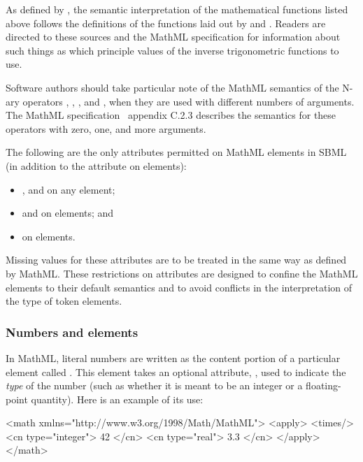 As defined by \mathmltwo, the semantic interpretation of the
mathematical functions listed above follows the definitions of the
functions laid out by \cite{abramowitz:1997} and
\cite{zwillinger:1988}.  Readers are directed to these sources and
the MathML specification for information about such things as
which principle values of the inverse trigonometric functions to
use.

Software authors should take particular note of the MathML
semantics of the N-ary operators , ,
,  and , when they are used with
different numbers of arguments.  The MathML
specification~\citep{w3c:2000b} appendix C.2.3 describes the
semantics for these operators with zero, one, and more arguments.

The following are the only attributes permitted on MathML elements
in SBML (in addition to the  attribute on
 elements):
\begin{itemize}\setlength{\parskip}{-0.2ex}

\item {},  and  on any element;

\item {} and  on
   elements; and

\item {} on  elements.

\end{itemize}\vspace*{-0.75ex}
Missing values for these attributes are to be treated in the same
way as defined by MathML.  These restrictions on attributes are
designed to confine the MathML elements to their default semantics
and to avoid conflicts in the interpretation of the type of token
elements.


\subsubsection{Numbers and  elements}
\label{sec:cn-token}
\label{sec:mathml-value-space}

In MathML, literal numbers are written as the content portion of a
particular element called .  This element takes an
optional attribute, , used to indicate the \emph{type}
of the number (such as whether it is meant to be an integer or a
floating-point quantity).  Here is an example of its use:
\begin{example}
<math xmlns="http://www.w3.org/1998/Math/MathML">
    <apply>
        <times/> <cn type="integer"> 42 </cn> <cn type="real"> 3.3 </cn>
    </apply>
</math>
\end{example}

